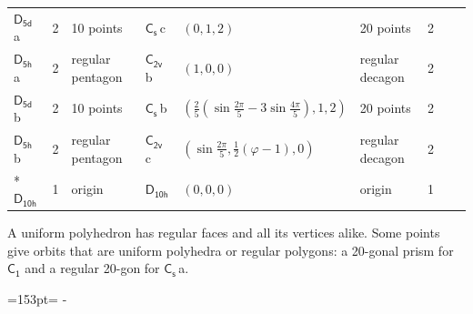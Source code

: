 \documentclass[10pt,a4paper]{article}
\newcommand{\needspace}[1]{\par\penalty-100\begingroup\dimen0=#1\relax\dimen2=\pagegoal
  \advance\dimen2-\pagetotal\ifdim\dimen0>\dimen2\relax\ifdim\dimen2>0pt\vfil\break\fi\fi
  \endgroup}
\numberwithin{equation}{section}
\newcommand{\grp}[1]{\mathsf{#1}}
\newcommand{\clsletter}[1]{\,{\scriptsize\color{black!55}#1}}
\newcommand{\goldenratio}{\varphi}
\newlength{\fillwidth}\newlength{\cellwidth}\newlength{\colwidth}
\begin{document}
{{\begin{longtable}{@{}lrllllr>{\RaggedRight\arraybackslash}p{\fillwidth}r@{}}
\href{D5d.pdf}{$\grp{D_{5d}}$}\clsletter{a} & 2 & 10 points & \href{C1v.pdf}{$\grp{C_{s}}$}\clsletter{c} & $(0, 1, 2)$ & 20 points & 2 &  & \\
\href{D5h.pdf}{$\grp{D_{5h}}$}\clsletter{a} & 2 & regular pentagon & \href{C2v.pdf}{$\grp{C_{2v}}$}\clsletter{b} & $(1, 0, 0)$ & regular decagon & 2 &  & \\
\href{D5d.pdf}{$\grp{D_{5d}}$}\clsletter{b} & 2 & 10 points & \href{C1v.pdf}{$\grp{C_{s}}$}\clsletter{b} & $(\tfrac{2}{5}(\sin\tfrac{2\pi}{5} - 3\sin\tfrac{4\pi}{5}), 1, 2)$ & 20 points & 2 &  & \\
\href{D5h.pdf}{$\grp{D_{5h}}$}\clsletter{b} & 2 & regular pentagon & \href{C2v.pdf}{$\grp{C_{2v}}$}\clsletter{c} & $(\sin\tfrac{2\pi}{5}, \tfrac{1}{2}(\goldenratio - 1), 0)$ & regular decagon & 2 &  & \\*
\href{D10h.pdf}{$\grp{D_{10h}}$} & 1 & origin & \href{D10h.pdf}{$\grp{D_{10h}}$} & $(0, 0, 0)$ & origin & 1 &  & \\
\bottomrule\end{longtable}}}
A uniform polyhedron has regular faces and all its vertices alike. Some points give orbits that are uniform polyhedra or regular polygons: a 20-gonal prism for \href{C1.pdf}{$\grp{C_{1}}$} and a regular 20-gon for \href{C1v.pdf}{$\grp{C_{s}}$}\clsletter{a}.
\needspace{153pt}
\end{document}
